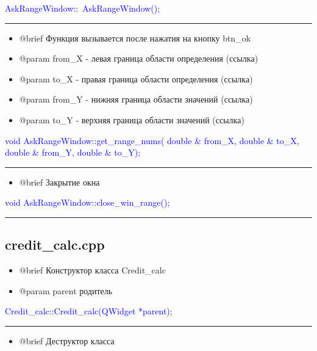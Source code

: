 \documentclass{article}
\begin{document}
\textcolor{blue}{AskRangeWindow::~AskRangeWindow();}

{\color{red} \rule{\linewidth}{0.5mm}}

\begin{itemize}

\item @brief Функция вызывается после нажатия на кнопку btn\_ok
\item @param from\_X - левая граница области определения (ссылка)
\item @param to\_X - правая граница области определения (ссылка)
\item @param from\_Y - нижняя граница области значений (ссылка)
\item @param to\_Y - верхняя граница области значений (ссылка)

\end{itemize}

\textcolor{blue}{void AskRangeWindow::get\_range\_nums(
    double \&  from\_X, double \&  to\_X, double \& from\_Y, double \& to\_Y);}


{\color{red} \rule{\linewidth}{0.5mm}}

\begin{itemize}

\item @brief Закрытие окна

\end{itemize}

\textcolor{blue}{void AskRangeWindow::close\_win\_range();}

{\color{red} \rule{\linewidth}{0.5mm}}


\subsection{\textbf{credit\_calc.cpp}}

\begin{itemize}

\item @brief Конструктор класса Credit\_calc
\item @param parent родитель

\end{itemize}

\textcolor{blue}{Credit\_calc::Credit\_calc(QWidget *parent);}

{\color{red} \rule{\linewidth}{0.5mm}}


\begin{itemize}

\item @brief Деструктор класса

\end{itemize}
\end{document}
